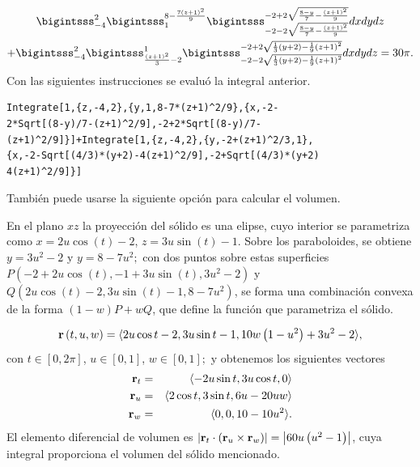 \begin{multline*}
\bigintsss_{-4}^2\bigintsss_{1}^{8-\frac{7\left( z+1\right) ^2}{9}}\bigintsss_{-2-2\sqrt{\frac{8-y}{7}-\frac{\left( z+1\right) ^2}{9}}}^{-2+2\sqrt{\frac{8-y}{7}-\frac{\left( z+1\right) ^2}{9}}}dxdydz \\
+\bigintsss_{-4}^2\bigintsss_{\frac{\left(z+1\right) ^2}{3}-2}^{1}\bigintsss_{-2-2\sqrt{\frac{1}{3}\left( y+2\right) -\frac{1}{9}\left( z+1\right) ^2}}^{-2+2\sqrt{\frac{1}{3}\left( y+2\right) -\frac{1}{9}\left( z+1\right) ^2}}dxdydz= 30\pi.
\end{multline*}
Con las siguientes instrucciones se evaluó la integral anterior.

\begin{tcolorbox}[title=\bf Instrucción en \verb"Mathematica"]\begin{Verbatim}[formatcom=\letraverbatim]
Integrate[1,{z,-4,2},{y,1,8-7*(z+1)^2/9},{x,-2-
2*Sqrt[(8-y)/7-(z+1)^2/9],-2+2*Sqrt[(8-y)/7-
(z+1)^2/9]}]+Integrate[1,{z,-4,2},{y,-2+(z+1)^2/3,1},
{x,-2-Sqrt[(4/3)*(y+2)-4(z+1)^2/9],-2+Sqrt[(4/3)*(y+2)
4(z+1)^2/9]}]
\end{Verbatim}
\end{tcolorbox}

También puede usarse la siguiente opción para calcular el volumen.

En el plano $xz$ la proyección del sólido es una elipse, cuyo interior se parametriza como $x=2u\cos(t)-2$, $z=3u\sin(t)-1$. Sobre los parabo\-loides, se obtiene $y=3u^2-2$ y $y=8-7u^2;$
con dos puntos sobre estas superficies $P(-2+2u\cos (t) ,-1+3u\sin (t),3u^2-2)$ y
$Q(2u\cos (t)-2,3u\sin (t)-1,8-7u^2)$, se forma una combinación convexa de la forma $(1-w)P+wQ$, que define la función que parametriza el sólido.

\begin{equation*}
{\bf r}\left( t,u,w\right) =\langle 2u\cos t-2,3u\sin t-1,10w\left( 1-u^2\right) +3u^2-2 \rangle,
\end{equation*}
con $t\in [0,2\pi ]$, $u\in [0,1]$, $w\in [0,1];$
y obtenemos los siguientes vectores
\begin{eqnarray*}
{\bf r}_{t}&=& \langle -2u\sin t,3u\cos t,0\rangle \\
{\bf r}_{u}&=& \langle 2\cos t,3\sin t,6u-20uw\rangle\\
{\bf r}_{w}&=& \langle 0,0,10-10u^2\rangle.
\end{eqnarray*}
El elemento diferencial de volumen es
$\left\vert {\bf r}_{t}\cdot \left({\bf r}_{u}\times {\bf r}_{w}\right) \right\vert
=\left\vert 60u\left( u^2-1\right) \right\vert $,
cuya integral proporciona el volumen del sólido mencionado.

